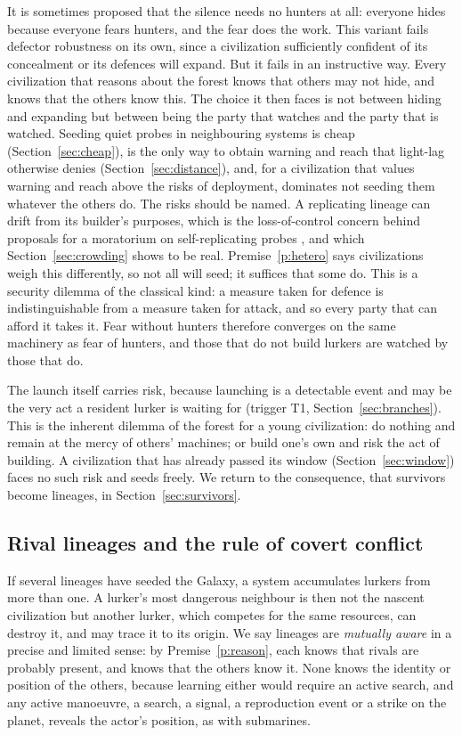 \documentclass[preprint,12pt]{elsarticle}
\theoremstyle{definition}
\begin{document}
It is sometimes proposed that the silence needs no hunters at all: everyone hides because everyone fears hunters, and the fear does the work. This variant fails defector robustness on its own, since a civilization sufficiently confident of its concealment or its defences will expand. But it fails in an instructive way. Every civilization that reasons about the forest knows that others may not hide, and knows that the others know this. The choice it then faces is not between hiding and expanding but between being the party that watches and the party that is watched. Seeding quiet probes in neighbouring systems is cheap (Section~\ref{sec:cheap}), is the only way to obtain warning and reach that light-lag otherwise denies (Section~\ref{sec:distance}), and, for a civilization that values warning and reach above the risks of deployment, dominates not seeding them whatever the others do. The risks should be named. A replicating lineage can drift from its builder's purposes, which is the loss-of-control concern behind proposals for a moratorium on self-replicating probes \citep{Forgan2019}, and which Section~\ref{sec:crowding} shows to be real. Premise~\ref{p:hetero} says civilizations weigh this differently, so not all will seed; it suffices that some do. This is a security dilemma of the classical kind: a measure taken for defence is indistinguishable from a measure taken for attack, and so every party that can afford it takes it. Fear without hunters therefore converges on the same machinery as fear of hunters, and those that do not build lurkers are watched by those that do.

The launch itself carries risk, because launching is a detectable event \citep{SandbergArmstrong2013} and may be the very act a resident lurker is waiting for (trigger T1, Section~\ref{sec:branches}). This is the inherent dilemma of the forest for a young civilization: do nothing and remain at the mercy of others' machines; or build one's own and risk the act of building. A civilization that has already passed its window (Section~\ref{sec:window}) faces no such risk and seeds freely. We return to the consequence, that survivors become lineages, in Section~\ref{sec:survivors}.

\subsection{Rival lineages and the rule of covert conflict}
\label{sec:rivals}

If several lineages have seeded the Galaxy, a system accumulates lurkers from more than one. A lurker's most dangerous neighbour is then not the nascent civilization but another lurker, which competes for the same resources, can destroy it, and may trace it to its origin. We say lineages are \emph{mutually aware} in a precise and limited sense: by Premise~\ref{p:reason}, each knows that rivals are probably present, and knows that the others know it. None knows the identity or position of the others, because learning either would require an active search, and any active manoeuvre, a search, a signal, a reproduction event or a strike on the planet, reveals the actor's position, as with submarines.
\end{document}
